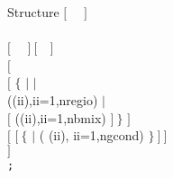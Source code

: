 \vskip -0.5cm

\begin{DataStructure}{Structure }
$[$~ ~$]$ \\
~~~ \\
$[$~ ~$]~[$~~$]$ \\
$[$~ \\
\hskip 1.0cm $[$  $\{$  $|$  $|$ \\
\hskip 2.0cm  ((ii),ii=1,nregio) $|$ \\
\hskip 2.0cm  $[$ ((ii),ii=1,nbmix) $]~\}$ $]$ \\
\hskip 1.0cm $[$  $[~\{$   $|$ ( (ii), ii=1,ngcond) $\}~]~]$\\
 $]$ \\
{\tt ;}
\end{DataStructure}

